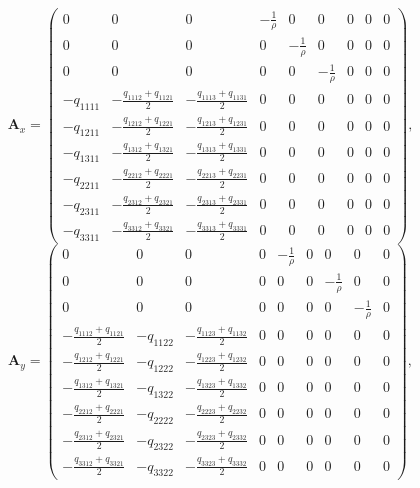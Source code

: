 \begin{displaymath}
\mathbf{A}_x =
\left( \begin{array}{cccccccccccc}
0 & 0 & 0 & -\frac 1 \rho & 0 & 0 & 0 & 0 & 0 \\ 
0 & 0 & 0 & 0 & -\frac 1 \rho & 0 & 0 & 0 & 0 \\ 
0 & 0 & 0 & 0 & 0 & -\frac 1 \rho & 0 & 0 & 0 \\ 
-q_{1111} & -\frac{q_{1112}+q_{1121}}{2} & -\frac{q_{1113}+q_{1131}}{2} & 0 & 0 & 0 & 0 & 0 & 0 \\ 
-q_{1211} & -\frac{q_{1212}+q_{1221}}{2} & -\frac{q_{1213}+q_{1231}}{2} & 0 & 0 & 0 & 0 & 0 & 0 \\ 
-q_{1311} & -\frac{q_{1312}+q_{1321}}{2} & -\frac{q_{1313}+q_{1331}}{2} & 0 & 0 & 0 & 0 & 0 & 0 \\ 
-q_{2211} & -\frac{q_{2212}+q_{2221}}{2} & -\frac{q_{2213}+q_{2231}}{2} & 0 & 0 & 0 & 0 & 0 & 0 \\ 
-q_{2311} & -\frac{q_{2312}+q_{2321}}{2} & -\frac{q_{2313}+q_{2331}}{2} & 0 & 0 & 0 & 0 & 0 & 0 \\ 
-q_{3311} & -\frac{q_{3312}+q_{3321}}{2} & -\frac{q_{3313}+q_{3331}}{2} & 0 & 0 & 0 & 0 & 0 & 0  
\end{array} \right),
\end{displaymath} 
\begin{displaymath}
\mathbf{A}_y =
\left( \begin{array}{cccccccccccc}
0 & 0 & 0 & 0 & -\frac 1 \rho & 0 & 0 & 0 & 0 \\ 
0 & 0 & 0 & 0 & 0 & 0 & -\frac 1 \rho & 0 & 0 \\ 
0 & 0 & 0 & 0 & 0 & 0 & 0 & -\frac 1 \rho & 0 \\ 
-\frac{q_{1112}+q_{1121}}{2} & -q_{1122} & -\frac{q_{1123}+q_{1132}}{2} & 0 & 0 & 0 & 0 & 0 & 0 \\ 
-\frac{q_{1212}+q_{1221}}{2} & -q_{1222} & -\frac{q_{1223}+q_{1232}}{2} & 0 & 0 & 0 & 0 & 0 & 0 \\ 
-\frac{q_{1312}+q_{1321}}{2} & -q_{1322} & -\frac{q_{1323}+q_{1332}}{2} & 0 & 0 & 0 & 0 & 0 & 0 \\ 
-\frac{q_{2212}+q_{2221}}{2} & -q_{2222} & -\frac{q_{2223}+q_{2232}}{2} & 0 & 0 & 0 & 0 & 0 & 0 \\ 
-\frac{q_{2312}+q_{2321}}{2} & -q_{2322} & -\frac{q_{2323}+q_{2332}}{2} & 0 & 0 & 0 & 0 & 0 & 0 \\ 
-\frac{q_{3312}+q_{3321}}{2} & -q_{3322} & -\frac{q_{3323}+q_{3332}}{2} & 0 & 0 & 0 & 0 & 0 & 0  
\end{array} \right),
\end{displaymath}
